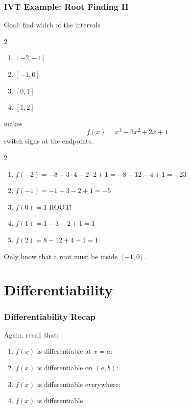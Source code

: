 \documentclass{ltx-talk}
\begin{document}
\begin{frame}
  \frametitle{IVT Example: Root Finding II}

  Goal: find which of the intervals
    \begin{multicols}{2}
    \begin{enumerate}
      \item $[-2, -1]$
      \item $[-1, 0]$
      \item $[0, 1]$
      \item $[1, 2]$
    \end{enumerate}
  \end{multicols} \pause
  makes
  \begin{equation}
    f(x) = x^3 - 3x^2 + 2x + 1
  \end{equation}
  switch signs at the endpoints. \pause

  \begin{multicols}{2}
    \begin{enumerate}
      \item $f(-2) = -8 - 3 \cdot 4 - 2 \cdot 2 + 1 = -8 - 12 - 4 + 1 = -23$ \pause
      \item $f(-1) = -1 - 3 - 2 + 1 = -5$ \pause
      \item $f(0) = 1$ \pause ROOT! \pause
      \item $f(1) = 1 - 3 + 2 + 1 = 1$ \pause
      \item $f(2) = 8 - 12 + 4 + 1 = 1$ \pause
    \end{enumerate}
  \end{multicols}

  Only know that a root must be inside $[-1, 0]$.
\end{frame}

\section{Differentiability}

\begin{frame}
  \frametitle{Differentiability Recap}

  Again, recall that: \pause
  \begin{enumerate}
    \item $f(x)$ is differentiable at $x = a$: 
    \item $f(x)$ is differentiable on $(a, b)$:
    \item $f(x)$ is differentiable everywhere:  
    \item $f(x)$ is differentiable
  \end{enumerate}
\end{frame}
\end{document}
